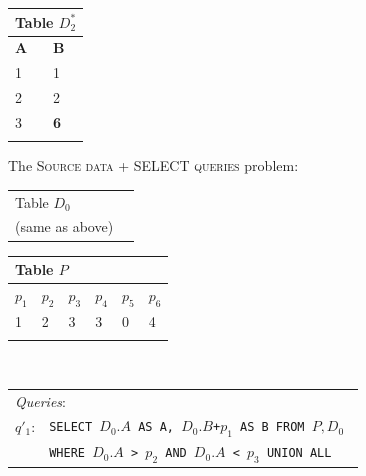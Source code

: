 \begin{figure}[t]
\begin{minipage}[t]{0.16\textwidth}
        \begin{tabular}{ll}
            \multicolumn{2}{l}{Table $D_2^*$}\\
            \toprule
            \textbf{A}  & \textbf{B}\\
            \midrule
			 1 & 1 \\
			 2 & 2 \\
			 3 & {\textbf{6}} \\
            \bottomrule
            \\
        \end{tabular}
    \end{minipage}
The \textsc{Source data + SELECT queries} problem: \\
\begin{minipage}[t]{0.1\textwidth}
         \vspace{0pt} 
         \centering
        \begin{tabular}{ll}
            \multicolumn{2}{l}{Table $D_0$}\\
            (same as above) \\
        \end{tabular}
    \end{minipage}
\begin{minipage}[t]{0.36\textwidth}
         \vspace{0pt} 
         \centering
        \begin{tabular}{llllll}
            \multicolumn{6}{l}{Table $P$}\\
            \toprule
            \textbf{$p_1$}  & \textbf{$p_2$} & \textbf{$p_3$} & \textbf{$p_4$}  & \textbf{$p_5$} & \textbf{$p_6$} \\
            \midrule
			 1 & 2 & 3 & 3 & 0 & 4\\
            \bottomrule
            \\
        \end{tabular}
    \end{minipage}\\
        \begin{minipage}[t]{0.22\textwidth}
         \vspace{0pt} 
         \centering
        \begin{tabular}{p{2ex}p{55ex}}
         \multicolumn{2}{l}{\emph{Queries}: }\\
        $q'_1$: &
        \texttt{\small SELECT $D_0.A$ AS A, $D_0.B$+$p_1$ AS B FROM $P, D_0$ } \\
        & \texttt{\small WHERE $D_0.A$ > $p_2$ AND $D_0.A$ < $p_3$ UNION ALL}\\

\end{tabular}
\end{minipage}
\end{figure}
